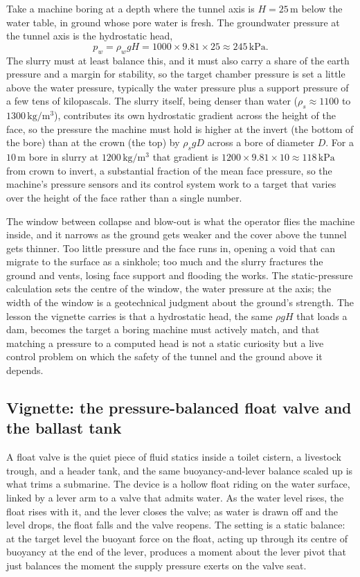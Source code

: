 Take a machine boring at a depth where the tunnel axis is $H = 25\,\si{
\meter}$ below the water table, in ground whose pore water is fresh. The
groundwater pressure at the tunnel axis is the hydrostatic head,
\[
p_w = \rho_w g H = 1000 \times 9.81 \times 25 \approx 245\,\text{kPa}.
\]
The slurry must at least balance this, and it must also carry a share of
the earth pressure and a margin for stability, so the target chamber
pressure is set a little above the water pressure, typically the water
pressure plus a support pressure of a few tens of kilopascals. The slurry
itself, being denser than water ($\rho_s \approx 1100$ to $1300\,\si{
\kilogram\per\meter\cubed}$), contributes its own hydrostatic gradient
across the height of the face, so the pressure the machine must hold is
higher at the invert (the bottom of the bore) than at the crown (the top)
by $\rho_s g D$ across a bore of diameter $D$. For a $10\,\si{\meter}$ bore
in slurry at $1200\,\si{\kilogram\per\meter\cubed}$ that gradient is
$1200 \times 9.81 \times 10 \approx 118\,\text{kPa}$ from crown to invert,
a substantial fraction of the mean face pressure, so the machine's
pressure sensors and its control system work to a target that varies over
the height of the face rather than a single number.

The window between collapse and blow-out is what the operator flies the
machine inside, and it narrows as the ground gets weaker and the cover
above the tunnel gets thinner. Too little pressure and the face runs in,
opening a void that can migrate to the surface as a sinkhole; too much and
the slurry fractures the ground and vents, losing face support and
flooding the works. The static-pressure calculation sets the centre of the
window, the water pressure at the axis; the width of the window is a
geotechnical judgment about the ground's strength. The lesson the vignette
carries is that a hydrostatic head, the same $\rho g H$ that loads a dam,
becomes the target a boring machine must actively match, and that matching
a pressure to a computed head is not a static curiosity but a live control
problem on which the safety of the tunnel and the ground above it depends.

\subsection{Vignette: the pressure-balanced float valve and the ballast tank}

A float valve is the quiet piece of fluid statics inside a toilet cistern,
a livestock trough, and a header tank, and the same buoyancy-and-lever
balance scaled up is what trims a submarine. The device is a hollow float
riding on the water surface, linked by a lever arm to a valve that admits
water. As the water level rises, the float rises with it, and the lever
closes the valve; as water is drawn off and the level drops, the float
falls and the valve reopens. The setting is a static balance: at the target
level the buoyant force on the float, acting up through its centre of
buoyancy at the end of the lever, produces a moment about the lever pivot
that just balances the moment the supply pressure exerts on the valve
seat.

